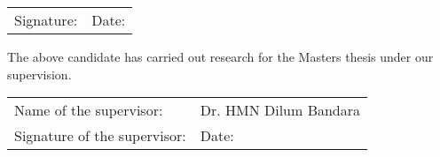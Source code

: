 \documentclass[a4paper,oneside,12pt]{report}
\begin{document}
\vspace{0.5in}
\noindent
\begin{tabu} to 1.0\textwidth { X[l] X[l] }
    Signature: & Date:
\end{tabu}



\vspace{0.5in}
\noindent
The above candidate has carried out research for the Masters thesis under our supervision.


\vspace{0.5in}
\noindent
\begin{tabu} to 1.0\textwidth { X[l] X[l] }
    Name of the supervisor: & Dr. HMN Dilum Bandara\\ [1.5ex]
    Signature of the supervisor: & Date:
\end{tabu}

\restoregeometry
\normalsize
\end{document}
